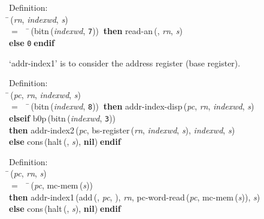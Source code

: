 \begin{tabbing}{\sc Definition}: \\  
\=\,({\it{rn\/}}, {\it{indexwd\/}}, {\it{s\/}}) \\ 
$=$$\;\;\;\;$\=\,({\rm{bitn}}\,({\it{indexwd\/}}, {\tt{7}}))$\;\;${\bf then }{\rm{read-an}}\,({}, {\it{rn\/}}, {\it{s\/}}) \\ 
{\bf else }{\tt{0}}$\;${\bf  endif}\-\-
\end{tabbing}

 `addr-index1' is to consider the address register (base register).
\begin{tabbing}{\sc Definition}: \\  
\=\,({\it{pc\/}}, {\it{rn\/}}, {\it{indexwd\/}}, {\it{s\/}}) \\ 
$=$$\;\;\;\;$\=\,({\rm{bitn}}\,({\it{indexwd\/}}, {\tt{8}}))$\;\;${\bf then }{\rm{addr-index-disp}}\,({\it{pc\/}}, {\it{rn\/}}, {\it{indexwd\/}}, {\it{s\/}}) \\ 
{\bf elseif }{\rm{b0p}}\,({\rm{bitn}}\,({\it{indexwd\/}}, {\tt{3}})) \\ 
{\bf then }{\rm{addr-index2}}\,({\it{pc\/}}, {\rm{bs-register}}\,({\it{rn\/}}, {\it{indexwd\/}}, {\it{s\/}}), {\it{indexwd\/}}, {\it{s\/}}) \\ 
{\bf else }{\rm{cons}}\,({\rm{halt}}\,({}, {\it{s\/}}), {\bf{nil}})$\;${\bf  endif}\-\-
\end{tabbing}

\begin{tabbing}{\sc Definition}: \\  
\=\,({\it{pc\/}}, {\it{rn\/}}, {\it{s\/}}) \\ 
$=$$\;\;\;\;$\=\,({\it{pc\/}}, {\rm{mc-mem}}\,({\it{s\/}})) \\ 
{\bf then }{\rm{addr-index1}}\,({\rm{add}}\,({}, {\it{pc\/}}, {}), {\it{rn\/}}, {\rm{pc-word-read}}\,({\it{pc\/}}, {\rm{mc-mem}}\,({\it{s\/}})), {\it{s\/}}) \\ 
{\bf else }{\rm{cons}}\,({\rm{halt}}\,({}, {\it{s\/}}), {\bf{nil}})$\;${\bf  endif}\-\-
\end{tabbing}


